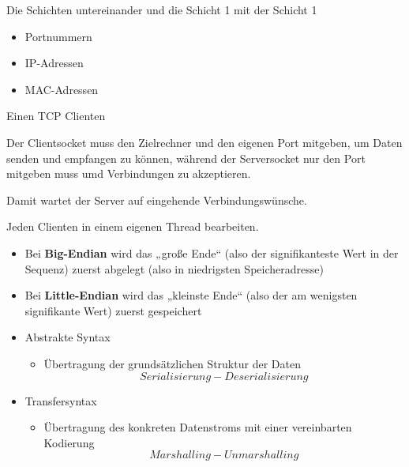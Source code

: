 
Die Schichten untereinander und die Schicht 1 mit der Schicht 1

\begin{itemize}
    \item Portnummern
    \item IP-Adressen
    \item MAC-Adressen
\end{itemize}

Einen TCP Clienten

Der Clientsocket muss den Zielrechner und den eigenen Port mitgeben, um Daten senden und empfangen zu können, während der Serversocket nur den Port mitgeben muss umd Verbindungen zu akzeptieren.


Damit wartet der Server auf eingehende Verbindungswünsche.

Jeden Clienten in einem eigenen Thread bearbeiten.

\begin{itemize}
    \item Bei \textbf{Big-Endian} wird das „große Ende“ (also der signifikanteste Wert in der Sequenz) zuerst abgelegt (also in niedrigsten Speicheradresse)
    \item Bei \textbf{Little-Endian} wird das „kleinste Ende“ (also der am wenigsten signifikante Wert) zuerst gespeichert
\end{itemize}

\begin{itemize}
    \item Abstrakte Syntax
    \begin{itemize}
        \item Übertragung der grundsätzlichen Struktur der Daten \[Serialisierung - Deserialisierung\]
    \end{itemize}
    \item Transfersyntax
    \begin{itemize}
        \item Übertragung des konkreten Datenstroms mit einer vereinbarten Kodierung \[Marshalling - Unmarshalling\]
    \end{itemize}
\end{itemize}

